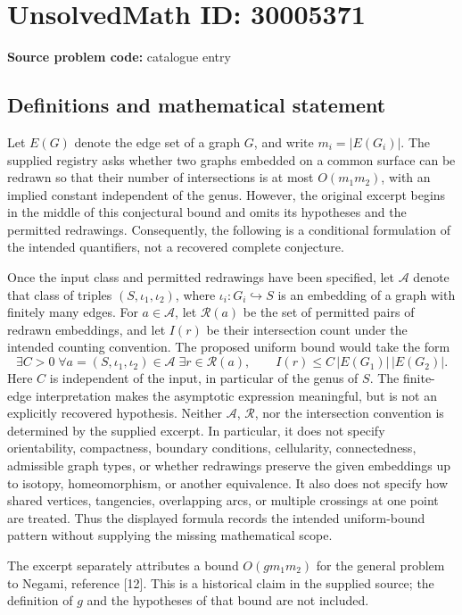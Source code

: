 \documentclass[11pt]{article}
\begin{document}
\section*{UnsolvedMath ID: 30005371}
\textbf{Source problem code:} catalogue entry
\subsection{Definitions and mathematical statement}
Let \(E(G)\) denote the edge set of a graph \(G\), and write \(m_i=|E(G_i)|\). The supplied registry asks whether two graphs embedded on a common surface can be redrawn so that their number of intersections is at most \(O(m_1m_2)\), with an implied constant independent of the genus. However, the original excerpt begins in the middle of this conjectural bound and omits its hypotheses and the permitted redrawings. Consequently, the following is a conditional formulation of the intended quantifiers, not a recovered complete conjecture.

Once the input class and permitted redrawings have been specified, let \(\mathcal A\) denote that class of triples \((S,\iota_1,\iota_2)\), where \(\iota_i:G_i\hookrightarrow S\) is an embedding of a graph with finitely many edges. For \(a\in\mathcal A\), let \(\mathcal R(a)\) be the set of permitted pairs of redrawn embeddings, and let \(I(r)\) be their intersection count under the intended counting convention. The proposed uniform bound would take the form
\[
\exists C>0\;\forall a=(S,\iota_1,\iota_2)\in\mathcal A\;\exists r\in\mathcal R(a),
\qquad I(r)\le C\,|E(G_1)|\,|E(G_2)|.
\]
Here \(C\) is independent of the input, in particular of the genus of \(S\). The finite-edge interpretation makes the asymptotic expression meaningful, but is not an explicitly recovered hypothesis. Neither \(\mathcal A\), \(\mathcal R\), nor the intersection convention is determined by the supplied excerpt. In particular, it does not specify orientability, compactness, boundary conditions, cellularity, connectedness, admissible graph types, or whether redrawings preserve the given embeddings up to isotopy, homeomorphism, or another equivalence. It also does not specify how shared vertices, tangencies, overlapping arcs, or multiple crossings at one point are treated. Thus the displayed formula records the intended uniform-bound pattern without supplying the missing mathematical scope.

The excerpt separately attributes a bound \(O(gm_1m_2)\) for the general problem to Negami, reference [12]. This is a historical claim in the supplied source; the definition of \(g\) and the hypotheses of that bound are not included.
\end{document}
